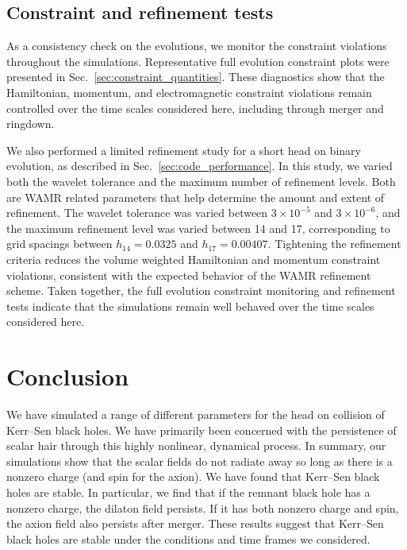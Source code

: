 \subsection{Constraint and refinement tests}
\label{sec:numerical_diagnostics}

As a consistency check on the evolutions, we monitor the constraint
violations throughout the simulations. Representative full evolution
constraint plots were presented in Sec.~\ref{sec:constraint_quantities}.
These diagnostics show that the Hamiltonian, momentum, and electromagnetic
constraint violations remain controlled over the time scales considered
here, including through merger and ringdown.

We also performed a limited refinement study for a short head on binary
evolution, as described in Sec.~\ref{sec:code_performance}. In this study,
we varied both the wavelet tolerance and the maximum number of refinement
levels. Both are WAMR related parameters that help determine the amount and
extent of refinement. The wavelet tolerance was varied between
$3\times10^{-5}$ and $3\times10^{-6}$, and the maximum refinement level was
varied between 14 and 17, corresponding to grid spacings between
$h_{14}=0.0325$ and $h_{17}=0.00407$. Tightening the refinement criteria
reduces the volume weighted Hamiltonian and momentum constraint violations,
consistent with the expected behavior of the WAMR refinement scheme. Taken
together, the full evolution constraint monitoring and refinement tests
indicate that the simulations remain well behaved over the time scales
considered here.


\section{Conclusion}
\label{sec:conclusion}
We have simulated a range of different parameters for the head on collision of Kerr--Sen black holes. We have primarily been concerned with the persistence of scalar hair through this highly nonlinear, dynamical process.  
In summary, our simulations show that the scalar fields do not radiate away so long as there is a nonzero charge (and spin for the axion). We have found that Kerr--Sen black holes are stable. In particular, we find that if the remnant black hole has a nonzero charge, the dilaton field persists. If it has both nonzero charge and spin, the axion field also persists after merger. These results suggest that Kerr--Sen black holes are stable under the conditions and time frames we considered.  

